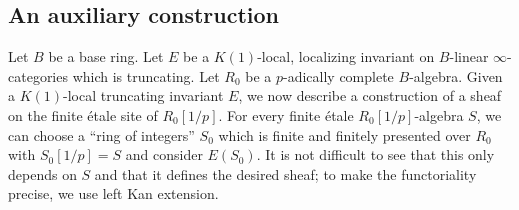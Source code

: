 \documentclass{amsart}
\theoremstyle{definition}
\begin{document}
\subsection{An auxiliary construction}
Let $B$ be a base ring. 
Let $E$ be a $K(1)$-local, localizing invariant on $B$-linear
$\infty$-categories which is truncating. 
Let $R_0$ be a $p$-adically complete $B$-algebra. 
Given a $K(1)$-local truncating invariant $E$, 
we now describe a construction of a sheaf on the finite \'etale site of
$R_0[1/p]$. 
For every finite \'etale $R_0[1/p]$-algebra $S$, we can choose a ``ring of
integers'' $S_0 $ which is finite and finitely presented over $R_0$ with $S_0[1/p] =  S$  and consider $E(S_0)$. 
It is not difficult to see that this only depends on $S$ and that it defines the
desired sheaf; to make the functoriality precise, we use left Kan extension. 
\end{document}
